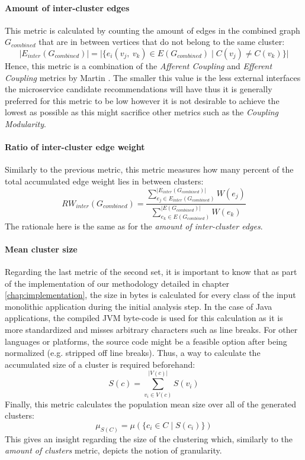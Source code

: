 \documentclass[12pt,a4paper]{report}
\begin{document}
\paragraph{Amount of inter-cluster edges}
This metric is calculated by counting the amount of edges in the combined graph
\(G_{combined}\) that are in between vertices that do not belong to the same cluster:
\[
  \vert E_{inter}(G_{combined}) \vert =
  \vert \{ e_i(v_j, \ v_k) \in E(G_{combined}) \mid C(v_j) \neq C(v_k) \} \vert
\]
Hence, this metric is a combination of the \textit{Afferent Coupling} and
\textit{Efferent Coupling} metrics by Martin \cite{martin2000design}.
The smaller this value is the less external interfaces the microservice candidate
recommendations will have thus it is generally preferred for this metric to be
low however it is not desirable to achieve the lowest as possible as this
might sacrifice other metrics such as the \textit{Coupling Modularity}.

\paragraph{Ratio of inter-cluster edge weight}
Similarly to the previous metric, this metric measures how many percent
of the total accumulated edge weight lies in between clusters:
\[
  RW_{inter}(G_{combined}) =
  \frac{
    \sum_{e_j \in E_{inter}(G_{combined})}^{\vert E_{inter}(G_{combined}) \vert} W(e_j)
  }{
    \sum_{e_k \in E(G_{combined})}^{\vert E(G_{combined}) \vert} W(e_k)
  }
\]
The rationale here is the same as for the \textit{amount of inter-cluster edges}.

\paragraph{Mean cluster size}
Regarding the last metric of the second set, it is important to know that
as part of the implementation of our methodology detailed in chapter
\ref{chap:implementation}, the size in bytes is calculated for every class
of the input monolithic application during the initial analysis step.
In the case of Java applications, the compiled JVM byte-code is used for this
calculation as it is more standardized and misses arbitrary characters such as
line breaks. For other languages or platforms, the source code might be a
feasible option after being normalized (e.g. stripped off line breaks).
Thus, a way to calculate the accumulated size of a cluster is required beforehand:
\[
  S(c) = \sum_{v_i \in V(c)}^{\vert V(c) \vert} S(v_i)
\]
Finally, this metric calculates the population mean size over all of the
generated clusters:
\[
  \mu_{S(C)} = \mu(\{ c_i \in C \mid S(c_i) \})
\]
This gives an insight regarding the size of the clustering which, similarly to
the \textit{amount of clusters} metric, depicts the notion of granularity.
\end{document}
